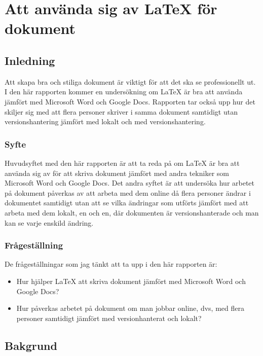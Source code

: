 \chapter{Att använda sig av LaTeX för dokument}
\label{cha:indiv-report-tuhkala}

\section{Inledning}
\label{sec:introduction-tuhkala}
Att skapa bra och stiliga dokument är viktigt för att det ska se professionellt ut. I den här rapporten kommer en undersökning om LaTeX är bra att använda jämfört med Microsoft Word och Google Docs. Rapporten tar också upp hur det skiljer sig med att flera personer skriver i samma dokument samtidigt utan versionshantering jämfört med lokalt och med versionshantering.

\subsection{Syfte}
\label{sec:purpose-tuhkala}
Huvudsyftet med den här rapporten är att ta reda på om LaTeX är bra att använda sig av för att skriva dokument jämfört med andra tekniker som Microsoft Word och Google Docs. Det andra syftet är att undersöka hur arbetet på dokument påverkas av att arbeta med dem online då flera personer ändrar i dokumentet samtidigt utan att se vilka ändringar som utförts jämfört med att arbeta med dem lokalt, en och en, där dokumenten är versionshanterade och man kan se varje enskild ändring.

\subsection{Frågeställning}
\label{sec:issue-tuhkala}
De frågeställningar som jag tänkt att ta upp i den här rapporten är:

\begin{itemize}
	\item Hur hjälper LaTeX att skriva dokument jämfört med Microsoft Word och Google Docs?
	\item Hur påverkas arbetet på dokument om man jobbar online, dvs, med flera personer samtidigt jämfört med versionhanterat och lokalt?
\end{itemize}

\section{Bakgrund}
\label{sec:background-tuhkala}

